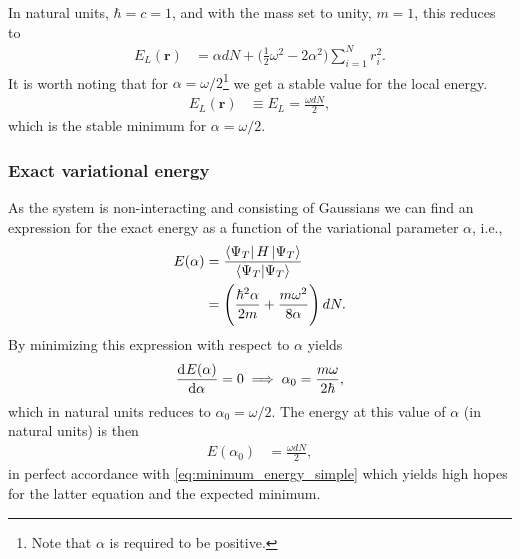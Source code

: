 \documentclass[
    a4paper, aps, twocolumn, floatfix, superscriptaddress,
    nofootinbib]{revtex4-1}
\newcommand{\vf}{\mathbf}
\newcommand{\1}{\mathds{1}}
\newcommand{\half}{\frac{1}{2}}
\begin{document}
        In natural units, $\hbar = c = 1$, and with the mass set to unity, $m =
        1$, this reduces to
        \begin{align}
            E_L(\vf{r})
            &=
            \alpha dN
            + \biggl(
                \half\omega^2
                - 2\alpha^2
            \biggr)
            \sum_{i = 1}^N r_i^2.
            \label{eq:closed_form_natural_units_local_energy}
        \end{align}
        It is worth noting that for $\alpha = \omega/2$\footnote{Note that
        $\alpha$ is required to be positive.} we get a stable value for the
        local energy.
        \begin{align}
            E_L(\vf{r})
            &\equiv
            E_L
            =
            \frac{\omega d N}{2},
            \label{eq:minimum_energy_simple}
        \end{align}
        which is the stable minimum for $\alpha = \omega/2$.

        \subsubsection{Exact variational energy}
            As the system is non-interacting and consisting of Gaussians we can
            find an expression for the exact energy as a function of the
            variational parameter $\alpha$, i.e.,
            \begin{align}
                E(\alpha)
                &=
                \frac{\bra{\Psi_T}H\ket{\Psi_T}}{\bra{\Psi_T}\ket{\Psi_T}}
                \\
                &=
                \left(
                    \frac{\hbar^2 \alpha}{2m}
                    + \frac{m\omega^2}{8\alpha}
                \right)dN.
                \label{eq:exact_energy}
            \end{align}
            By minimizing this expression with respect to $\alpha$ yields
            \begin{align}
                \dod[]{E(\alpha)}{\alpha} = 0
                \implies
                \alpha_0 = \frac{m\omega}{2\hbar},
            \end{align}
            which in natural units reduces to $\alpha_0 = \omega/2$. The energy
            at this value of $\alpha$ (in natural units) is then
            \begin{align}
                E(\alpha_0)
                &=
                \frac{\omega dN}{2},
            \end{align}
            in perfect accordance with \autoref{eq:minimum_energy_simple} which
            yields high hopes for the latter equation and the expected minimum.
\end{document}
